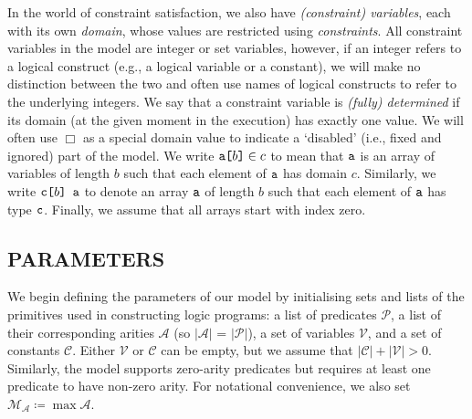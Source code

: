 \documentclass[letterpaper]{article}
\theoremstyle{definition}
\newcommand{\variable}[1]{\texttt{\textup{#1}}}
\newcommand{\arrayd}[3]{\variable{{#1}[}{#2}\variable{]} \in {#3}}
\newcommand{\arrayt}[3]{\variable{{#3}[}{#2}\variable{] {#1}}}
\newcommand{\predicates}{\mathcal{P}}
\newcommand{\variables}{\mathcal{V}}
\newcommand{\constants}{\mathcal{C}}
\newcommand{\arities}{\mathcal{A}}
\newcommand{\maxArity}{\mathcal{M}_{\mathcal{A}}}
\begin{document}
In the world of constraint satisfaction, we also have \emph{(constraint)
  variables}, each with its own \emph{domain}, whose values are restricted using
\emph{constraints}. All constraint variables in the model are integer or set
variables, however, if an integer refers to a logical construct
(e.g., a logical variable or a constant), we will make no distinction between
the two and often use names of logical constructs to refer to the underlying
integers. We say that a constraint variable is \emph{(fully) determined} if its
domain (at the given moment in the execution) has exactly one value. We will
often use $\Box$ as a special domain value to indicate a `disabled' (i.e., fixed
and ignored) part of the model. We write $\arrayd{a}{b}{c}$ to mean that
$\variable{a}$ is an array of variables of length $b$ such that each element of
$\variable{a}$ has domain $c$. Similarly, we write $\arrayt{a}{b}{c}$ to denote
an array $\variable{a}$ of length $b$ such that each element of $\variable{a}$
has type $\variable{c}$. Finally, we assume that all arrays start with index
zero.

\subsection{PARAMETERS}

We begin defining the parameters of our model by initialising sets and lists
of the primitives used in constructing logic programs: a list of predicates
$\predicates{}$, a list of their corresponding arities $\arities{}$ (so
$|\arities{}|$ = $|\predicates{}|$), a set of variables $\variables{}$, and a
set of constants $\constants{}$. Either $\variables{}$ or $\constants{}$ can be
empty, but we assume that $|\constants{}| + |\variables{}| > 0$. Similarly, the
model supports zero-arity predicates but requires at least one predicate to have
non-zero arity. For notational convenience, we also set $\maxArity{} \coloneqq
\max \arities{}$.
\end{document}
